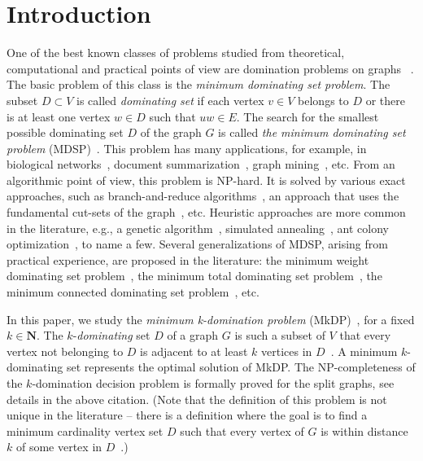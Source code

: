 \documentclass[dvipsnames,format=sigconf]{acmart} %
\begin{document}
\maketitle

\section{Introduction}
 
 One of the best known classes of problems studied from theoretical, computational and practical points of view are domination problems on graphs~ \cite{haynes2013fundamentals}. The basic problem of this class is the \textit{minimum dominating set problem}. The subset $D \subset V$ is called \emph{dominating set} if each vertex $v\in V$ belongs to $D$ or there is at least one vertex $w\in D$ such that $uw\in E$. The search for the smallest possible dominating set $D$ of the graph $G$ is called \emph{the minimum dominating set problem} (MDSP)~\cite{grandoni2006note}. This problem has many applications, for example, in biological networks~\cite{nacher2016minimum}, document summarization~\cite{shen2010multi}, graph mining~\cite{chalupa2018order}, etc. From an algorithmic point of view, this problem is NP-hard. It is solved by various exact approaches, such as branch-and-reduce algorithms~\cite{van2011exact}, an approach that uses the fundamental cut-sets of the graph~\cite{karci2020new}, etc. Heuristic approaches are more common in the literature, e.g., a genetic algorithm~\cite{hedar2010hybrid}, simulated annealing~\cite{hedar2012simulated}, ant colony optimization~\cite{ho2006enhanced}, to name a few. Several generalizations of MDSP, arising from practical experience, are proposed in the literature: the minimum weight dominating set problem~\cite{romania2010ant}, the minimum total dominating set problem~\cite{yuan2019novel}, the minimum connected dominating set problem~\cite{butenko2004new}, etc.


In this paper, we study the \emph{minimum k-domination problem} (MkDP)~\cite{corcoran2021heuristics}, for a fixed $k \in \mathbf{N}$. 
The $k$-\emph{dominating} set $D$ of a graph $G$ is such a subset of $V$ that every vertex not belonging to $D$ is adjacent to at least $k$ vertices in $D$~\cite{lan2013algorithmic}. A minimum $k$-dominating set represents the optimal solution of MkDP. The NP-completeness of the $k$-domination decision problem is formally proved for the split graphs, see details in the above citation. (Note that the definition of this problem is not unique in the literature -- there is a definition where the goal is to find a minimum cardinality vertex set $D$ such that every vertex of $G$ is within distance $k$ of some vertex in $D$~\cite{chang1983k}.) 
 
\end{document}
